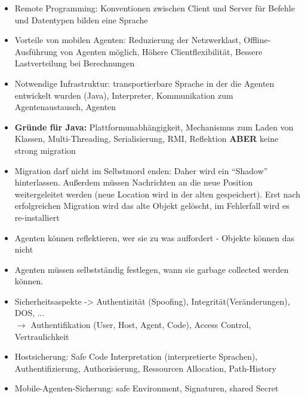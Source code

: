 \documentclass{article} %
\begin{document}
\begin{itemize}
		\item Remote Programming: Konventionen zwischen Client und Server für Befehle und Datentypen bilden eine Sprache
		\item Vorteile von mobilen Agenten: Reduzierung der Netzwerklast, Offline-Ausführung von Agenten möglich, Höhere Clientflexibilität, Bessere Lastverteilung bei Berechnungen
		\item Notwendige Infrastruktur: transportierbare Sprache in der die Agenten entwickelt wurden (Java), Interpreter, Kommunikation zum Agentenaustausch, Agenten
		\item \textbf{Gründe für Java:} Plattformunabhängigkeit, Mechanismus zum Laden von Klassen, Multi-Threading, Serialisierung, RMI, Reflektion \textbf{ABER} keine strong migration
		\item Migration darf nicht im Selbstmord enden: Daher wird ein "`Shadow"' hinterlassen. Außerdem müssen Nachrichten an die neue Position weitergeleitet werden (neue Location wird in der alten gespeichert). Erst nach erfolgreichen Migration wird das alte Objekt gelöscht, im Fehlerfall wird es re-installiert		
		\item Agenten können reflektieren, wer sie zu was auffordert - Objekte können das nicht
		\item Agenten müssen selbstständig festlegen, wann sie garbage collected werden können.
		\item Sicherheitsaspekte -> Authentizität (Spoofing), Integrität(Veränderungen), DOS, ...\\
		$\rightarrow$ Authentifikation (User, Host, Agent, Code), Access Control, Vertraulichkeit
		\item Hostsicherung: Safe Code Interpretation (interpretierte Sprachen), Authentifizierung, Authorisierung, Ressourcen Allocation, Path-History
		\item Mobile-Agenten-Sicherung: safe Environment, Signaturen, shared Secret
	\end{itemize}
\end{document}
